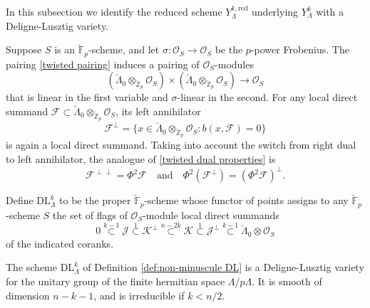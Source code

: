 \documentclass[11pt]{alggeom}
\newcommand{\red}{\mathrm{red}}
\newcommand{\Z}{\mathbb Z}
\newcommand{\F}{\mathbb F}
\newcommand{\co}{\mathcal O}
\begin{document}





In this subsection we identify the  reduced scheme $Y^{k,\red}_\Lambda$ underlying $Y^k_\Lambda$ with a Deligne-Lusztig variety.





Suppose $S$ is an $\breve{\F}_p$-scheme,  and let $\sigma :\co_S \to \co_S$ be the $p$-power Frobenius.
The pairing \eqref{twisted pairing}  induces a pairing of $\co_S$-modules
\[
 ( \breve{\Lambda}_0 \otimes_{ \breve{\Z}_p} \co_S ) \times ( \breve{\Lambda}_0 \otimes_{ \breve{\Z}_p}  \co_S )
  \to \co_S
\]
that is linear in the first variable and $\sigma$-linear in the second.
For any local direct summand $\mathscr{F} \subset  \breve{\Lambda}_0 \otimes_{ \breve{\Z}_p}  \co_S$,  its left annihilator 
\[
\mathscr{F}^\perp = \{ x \in  \breve{\Lambda}_0 \otimes_{ \breve{\Z}_p}   \co_S :  b( x, \mathscr{F} ) =0 \}
\]
is again a  local direct summand.  Taking into account the switch from right dual to left annihilator, 
the analogue of \eqref{twisted dual properties} is 
\[
\mathscr{F}^{\perp \perp}= \Phi^2 \mathscr{F} 
\quad \mbox{and}\quad
 \Phi^2(\mathscr{F}^\perp) = (\Phi^2 \mathscr{F})^\perp.
\]



\begin{definition}\label{def:non-minuscule DL}
Define $\mathrm{DL}_\Lambda^k$ to be the proper $\breve{\F}_p$-scheme whose functor of points assigns to any $\breve{\F}_p$-scheme $S$ the set of flags of $\co_S$-module local direct summands
\[
0 \stackrel{k-1}{\subset}  \mathscr{J} \stackrel{1}{\subset} \mathscr{K}^\perp 
\stackrel{n-2k}{\subset}      \mathscr{K} \stackrel{1}{\subset} \mathscr{J}^\perp \stackrel{k-1}{\subset}
 \breve{\Lambda}_0 \otimes \co_S
\]
of the indicated coranks.   
\end{definition}








\begin{proposition}\label{prop:DLstructure}
The scheme $\mathrm{DL}_\Lambda^k$ of Definition \ref{def:non-minuscule DL} is a  Deligne-Lusztig variety for the unitary group of the finite hermitian space $\Lambda/p\Lambda$.
 It is  smooth of dimension $n-k-1$, and is  irreducible if $k<n/2$. 
\end{proposition}
\end{document}

